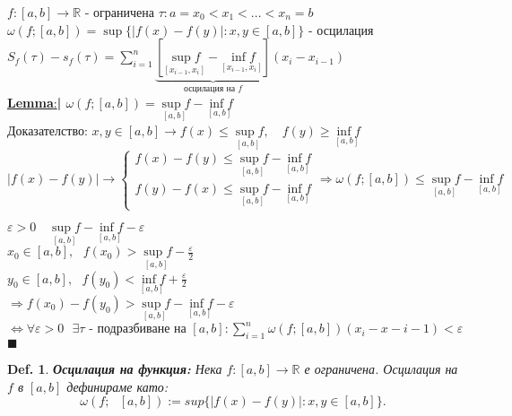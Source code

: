 \documentclass[12pt]{article}
\newtheorem{definition}{Def.}
\newcommand{\spc}{\text{ }}
\newcommand{\halfbox}[1]{\underline{\textbf{#1}:}\textbf{\large{| }}}
\begin{document}
	$\spc$\\
	$f:[a,b]\rightarrow\mathbb{R}$ - ограничена
	\hfill $\tau:a=x_0<x_1<...<x_n=b$\\
	$\omega(f;[a,b])=\sup\{|f(x)-f(y)|:x,y\in[a,b]\}$ - осцилация
	\\ $S_f(\tau)-s_f(\tau)=\sum_{i=1}^{n}\underbrace{[\underset{[x_{i-1},x_i]}{\sup f} - \underset{[x_{i-1},x_i]}{\inf f}]}_{\text{осцилация на }f}(x_i-x_{i-1})$\\
	
	\halfbox{Lemma} $\omega(f;[a,b])=\underset{[a,b]}{\sup f} - \underset{[a,b]}{\inf f}$\\
	Доказателство: $x,y\in[a,b]\rightarrow f(x)\leq \underset{[a,b]}{\sup f},\quad f(y)\geq \underset{[a,b]}{\inf f}$\\
	\begin{equation*}
		|f(x)-f(y)|\longrightarrow
		\begin{cases}
			f(x)-f(y)\leq\underset{[a,b]}{\sup f}-\underset{[a,b]}{\inf f}\\
			f(y)-f(x)\leq\underset{[a,b]}{\sup f}-\underset{[a,b]}{\inf f}
		\end{cases}
		\Rightarrow\omega(f;[a,b])\leq \underset{[a,b]}{\sup f}-\underset{[a,b]}{\inf f}
	\end{equation*}
	
	$\spc$\\
	$\varepsilon>0\quad \underset{[a,b]}{\sup f}-\underset{[a,b]}{\inf f} - \varepsilon$\\
	$x_0\in[a,b],\spc f(x_0)>\underset{[a,b]}{\sup f}-\frac{\varepsilon}{2}$\\
	$y_0\in[a,b],\spc f(y_0)<\underset{[a,b]}{\inf f}+\frac{\varepsilon}{2}$\\
	$\Rightarrow f(x_0)-f(y_0)>\underset{[a,b]}{\sup f}-\underset{[a,b]}{\inf f}-\varepsilon$\\
	$\spc$
	\\
	$\Leftrightarrow \forall\varepsilon>0 \spc\exists\tau\text{ - подразбиване на }[a,b]:\sum_{i=1}^{n}\omega(f;[a,b])(x_i-x-{i-1})<\varepsilon$
	\hfill $\blacksquare$\\
	
	\begin{definition}
		\textbf{Осцилация на функция:} Нека $f:[a,b]\rightarrow\mathbb{R}$ е ограничена. Осцилация на $f$ в $[a,b]$ дефинираме като:\\
		\[\omega(f;\spc[a,b]) := sup\{|f(x) - f(y)| : x,y\in [a,b]\}.\]
	\end{definition}
	
\end{document}
